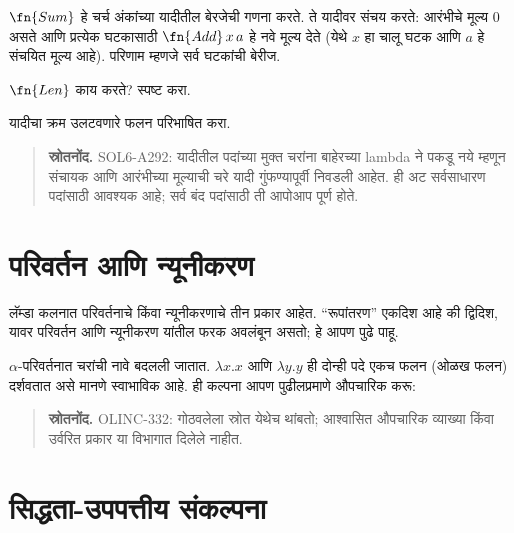 $\fn{Sum}$ हे चर्च अंकांच्या यादीतील बेरजेची गणना
करते. ते यादीवर संचय करते: आरंभीचे मूल्य
$\num{0}$ असते आणि प्रत्येक घटकासाठी
$\fn{Add} \, x\, a$ हे नवे मूल्य देते
(येथे $x$ हा चालू घटक आणि $a$ हे संचयित मूल्य आहे).
परिणाम म्हणजे सर्व घटकांची बेरीज.

\begin{prob}
  $\fn{Len}$ काय करते? स्पष्ट करा.
\end{prob}

\begin{prob}
  यादीचा क्रम उलटवणारे फलन परिभाषित करा.
\end{prob}


\begin{quote}\small\textbf{स्रोतनोंद.} SOL6-A292: यादीतील पदांच्या मुक्त चरांना बाहेरच्या lambda ने पकडू नये म्हणून संचायक आणि आरंभीच्या मूल्याची चरे यादी गुंफण्यापूर्वी निवडली आहेत. ही अट सर्वसाधारण पदांसाठी आवश्यक आहे; सर्व बंद पदांसाठी ती आपोआप पूर्ण होते.\end{quote}









\section{परिवर्तन आणि न्यूनीकरण}\label{lam:int:con:sec}

लॅम्डा कलनात परिवर्तनाचे किंवा न्यूनीकरणाचे तीन प्रकार आहेत.
“रूपांतरण” एकदिश आहे की द्विदिश, यावर परिवर्तन आणि
न्यूनीकरण यांतील फरक अवलंबून असतो; हे आपण पुढे पाहू.

$\alpha$-परिवर्तनात चरांची नावे बदलली जातात.
$\lambda x. x$ आणि $\lambda y.y$ ही दोन्ही पदे एकच फलन
(ओळख फलन) दर्शवतात असे मानणे स्वाभाविक आहे.
ही कल्पना आपण पुढीलप्रमाणे औपचारिक करू:




\begin{quote}\small\textbf{स्रोतनोंद.} OLINC-332: गोठवलेला स्रोत येथेच थांबतो; आश्वासित औपचारिक व्याख्या किंवा उर्वरित प्रकार या विभागात दिलेले नाहीत.\end{quote}










\section{सिद्धता-उपपत्तीय संकल्पना}\label{mvl:seq:prf:sec}



